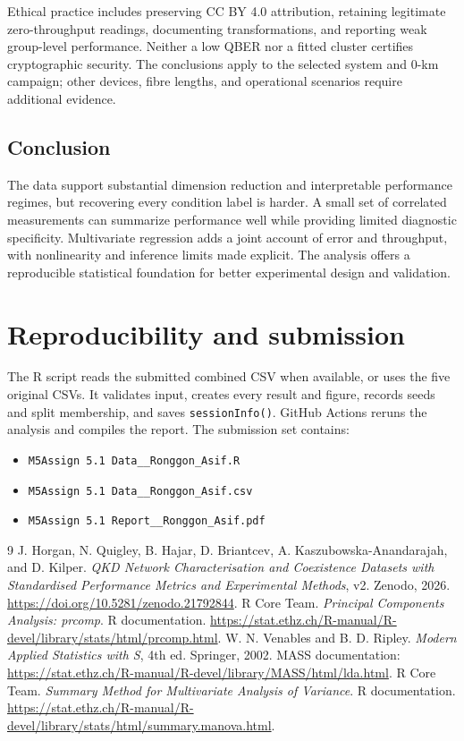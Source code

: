 \documentclass[11pt]{article}
\begin{document}
Ethical practice includes preserving CC BY 4.0 attribution, retaining legitimate zero-throughput readings, documenting transformations, and reporting weak group-level performance. Neither a low QBER nor a fitted cluster certifies cryptographic security. The conclusions apply to the selected system and 0-km campaign; other devices, fibre lengths, and operational scenarios require additional evidence.

\subsection{Conclusion}
The data support substantial dimension reduction and interpretable performance regimes, but recovering every condition label is harder. A small set of correlated measurements can summarize performance well while providing limited diagnostic specificity. Multivariate regression adds a joint account of error and throughput, with nonlinearity and inference limits made explicit. The analysis offers a reproducible statistical foundation for better experimental design and validation.

\section*{Reproducibility and submission}
The R script reads the submitted combined CSV when available, or uses the five original CSVs. It validates input, creates every result and figure, records seeds and split membership, and saves \texttt{sessionInfo()}. GitHub Actions reruns the analysis and compiles the report. The submission set contains:
\begin{itemize}
\item \texttt{M5Assign 5.1 Data\_\_Ronggon\_Asif.R}
\item \texttt{M5Assign 5.1 Data\_\_Ronggon\_Asif.csv}
\item \texttt{M5Assign 5.1 Report\_\_Ronggon\_Asif.pdf}
\end{itemize}
\clearpage
\begin{thebibliography}{9}
\small
{} J. Horgan, N. Quigley, B. Hajar, D. Briantcev, A. Kaszubowska-Anandarajah, and D. Kilper. \emph{QKD Network Characterisation and Coexistence Datasets with Standardised Performance Metrics and Experimental Methods}, v2. Zenodo, 2026. \url{https://doi.org/10.5281/zenodo.21792844}.
 R Core Team. \emph{Principal Components Analysis: prcomp}. R documentation. \url{https://stat.ethz.ch/R-manual/R-devel/library/stats/html/prcomp.html}.
 W. N. Venables and B. D. Ripley. \emph{Modern Applied Statistics with S}, 4th ed. Springer, 2002. MASS documentation: \url{https://stat.ethz.ch/R-manual/R-devel/library/MASS/html/lda.html}.
 R Core Team. \emph{Summary Method for Multivariate Analysis of Variance}. R documentation. \url{https://stat.ethz.ch/R-manual/R-devel/library/stats/html/summary.manova.html}.
\end{thebibliography}
\clearpage
\appendix
\end{document}
